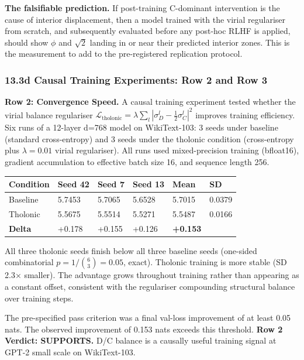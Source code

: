 \documentclass[
  11pt,
  letterpaper,
]{article}
\begin{document}
\textbf{The falsifiable prediction.} If post-training C-dominant
intervention is the cause of interior displacement, then a model trained
with the virial regulariser from scratch, and subsequently evaluated
before any post-hoc RLHF is applied, should show \(\phi\) and
\(\sqrt{2}\) landing in or near their predicted interior zones. This is
the measurement to add to the pre-registered replication protocol.

\subsubsection{13.3d Causal Training Experiments: Row 2 and Row
3}\label{d-causal-training-experiments-row-2-and-row-3}

\textbf{Row 2: Convergence Speed.} A causal training experiment tested
whether the virial balance regulariser
\(\mathcal{L}_{\text{tholonic}} = \lambda \sum_l |\sigma_D^l - \frac{1}{2}\sigma_C^l|^2\)
improves training efficiency. Six runs of a 12-layer d=768 model on
WikiText-103: 3 seeds under baseline (standard cross-entropy) and 3
seeds under the tholonic condition (cross-entropy plus \(\lambda=0.01\)
virial regulariser). All runs used mixed-precision training (bfloat16),
gradient accumulation to effective batch size 16, and sequence length
256.

\begin{longtable}[]{@{}llllll@{}}
\toprule\noalign{}
Condition & Seed 42 & Seed 7 & Seed 13 & Mean & SD \\
\midrule\noalign{}
\endhead
\bottomrule\noalign{}
\endlastfoot
Baseline & 5.7453 & 5.7065 & 5.6528 & 5.7015 & 0.0379 \\
Tholonic & 5.5675 & 5.5514 & 5.5271 & 5.5487 & 0.0166 \\
\textbf{Delta} & +0.178 & +0.155 & +0.126 & \textbf{+0.153} & \\
\end{longtable}

All three tholonic seeds finish below all three baseline seeds
(one-sided combinatorial \(p = 1/\binom{6}{3} = 0.05\), exact). Tholonic
training is more stable (SD 2.3× smaller). The advantage grows
throughout training rather than appearing as a constant offset,
consistent with the regulariser compounding structural balance over
training steps.

The pre-specified pass criterion was a final val-loss improvement of at
least 0.05 nats. The observed improvement of 0.153 nats exceeds this
threshold. \textbf{Row 2 Verdict: SUPPORTS.} D/C balance is a causally
useful training signal at GPT-2 small scale on WikiText-103.
\end{document}
